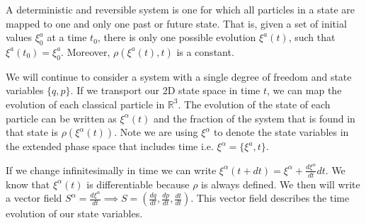 \documentclass{article}[a4paper]
\begin{document}
\begin{defn}
	A deterministic and reversible system is one for which all particles in a state are mapped to one and only one past or future state. That is, given a set of initial values $\xi^a_0$ at a time $t_0$, there is only one possible evolution $\xi^a(t)$, such that $\xi^a(t_0) = \xi^a_0$. Moreover, $\rho(\xi^a(t), t)$ is a constant.
\end{defn}

	We will continue to consider a system with a single degree of freedom and state variables $\{q,p \}$. If we transport our 2D state space in time $t$, we can map the evolution of each classical particle in $\mathbb{R}^3$. The evolution of the state of each particle can be written as $\xi^\alpha(t)$ and the fraction of the system that is found in that state is $\rho(\xi^\alpha(t))$. Note we are using $\xi^\alpha$ to denote the state variables in the extended phase space that includes time i.e. $\xi^\alpha = \{ \xi^a, t\}$.
	
	 If we change infinitesimally in time we can write $\xi^\alpha(t + dt) = \xi^\alpha + \frac{d\xi^\alpha}{dt}dt$. We know that $\xi^\alpha(t)$ is differentiable because $\rho$ is always defined. We then will write a vector field $S^\alpha =\frac{d\xi^\alpha}{dt} \implies S = (\frac{dq}{dt},\frac{dp}{dt},\frac{dt}{dt} )$. This vector field describes the time evolution of our state variables.
	
\end{document}
